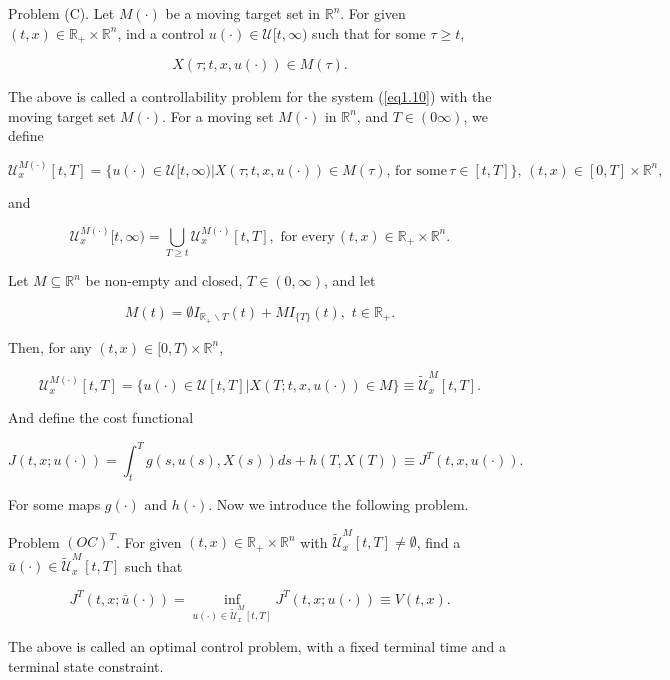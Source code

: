 Problem (C). Let $M(\cdot)$ be a moving target set in $\mathbb{R}^n$. For given $(t,x)\in \mathbb{R}_{+}\times \mathbb{R}^n$, ind a control $u(\cdot)\in \mathcal{U}[t,\infty)$ such that for some $\tau \geq t$,

$$X(\tau;t,x,u(\cdot))\in M(\tau).$$

The above is called a controllability problem for the system (\ref{eq1.10}) with the moving target set $M(\cdot)$. For a moving set $M(\cdot)$ in $\mathbb{R}^n$, and $T\in (0\infty)$, we define

$$\mathcal{U}^{M(\cdot)}_x[t,T]=\{u(\cdot)\in \mathcal{U}[t,\infty) | X(\tau;t,x,u(\cdot))\in M(\tau),\,\mbox{for some}\, \tau\in[t,T]\},\, (t,x)\in [0,T]\times \mathbb{R}^n,$$

and

$$\mathcal{U}^{M(\cdot)}_x[t,\infty)=\bigcup_{T\geq t}\mathcal{U}^{M(\cdot)}_x[t,T],\,\,\mbox{for every}\, (t,x)\in\mathbb{R}_{+}\times\mathbb{R}^n.$$

Let $M\subseteq \mathbb{R}^n$ be non-empty and closed, $T\in(0,\infty)$, and let

$$M(t)=\emptyset I_{\mathbb{R}_{+}\backslash{T}}(t)+MI_{\{T\}}(t),\,\, t\in \mathbb{R}_{+}.$$

Then, for any $(t,x)\in [0,T)\times \mathbb{R}^n$,

$$\mathcal{U}^{M(\cdot)}_x[t,T]=\{u(\cdot)\in \mathcal{U}[t,T] | X(T;t,x,u(\cdot))\in M \}\equiv \tilde{\mathcal{U}}^M_x [t,T].$$

And define the cost functional

$$J(t,x;u(\cdot))=\int_{t}^{T}g(s,u(s),X(s))ds+h(T,X(T))\equiv J^T(t,x,u(\cdot)).$$

For some maps $g(\cdot)$ and $h(\cdot)$. Now we introduce the following problem.

Problem $(OC)^T$. For given $(t,x)\in \mathbb{R}_{+}\times \mathbb{R}^n$ with $\tilde{\mathcal{U}}^M_x[t,T]\neq\emptyset$, find a $\bar{u}(\cdot)\in \tilde{\mathcal{U}}^M_x[t,T]$ such that

\begin{equation*}
J^T(t,x;\bar{u}(\cdot))=\inf_{u(\cdot)\in \tilde{\mathcal{U}}^M_x[t,T]} J^T(t,x;u(\cdot))\equiv V(t,x).
\end{equation*}

The above is called an optimal control problem, with a fixed terminal time and a terminal state constraint.